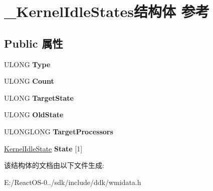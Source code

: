 \hypertarget{struct___kernel_idle_states}{}\section{\+\_\+\+Kernel\+Idle\+States结构体 参考}
\label{struct___kernel_idle_states}
\subsection*{Public 属性}
\begin{DoxyCompactItemize}
\item 
\mbox{\label{struct___kernel_idle_states_a69b60611d557eb930f85e924e80851f2}} 
U\+L\+O\+NG {\bfseries Type}
\item 
\mbox{\label{struct___kernel_idle_states_a0a6ade6007e306738f4f763ab2478ebc}} 
U\+L\+O\+NG {\bfseries Count}
\item 
\mbox{\label{struct___kernel_idle_states_a9e9a4e7d52f2d83314b843ee48fe1414}} 
U\+L\+O\+NG {\bfseries Target\+State}
\item 
\mbox{\label{struct___kernel_idle_states_ac819198125aea9a7cbfb024ae86b9c78}} 
U\+L\+O\+NG {\bfseries Old\+State}
\item 
\mbox{\label{struct___kernel_idle_states_a5841bed11974421b8fb179f86e5c6d65}} 
U\+L\+O\+N\+G\+L\+O\+NG {\bfseries Target\+Processors}
\item 
\mbox{\label{struct___kernel_idle_states_a5b1e2a3dcc8547c66f8a77be93bb7b8f}} 
\hyperlink{struct___kernel_idle_state}{Kernel\+Idle\+State} {\bfseries State} \mbox{[}1\mbox{]}
\end{DoxyCompactItemize}


该结构体的文档由以下文件生成\+:\begin{DoxyCompactItemize}
\item 
E\+:/\+React\+O\+S-\/0../sdk/include/ddk/wmidata.\+h\end{DoxyCompactItemize}
